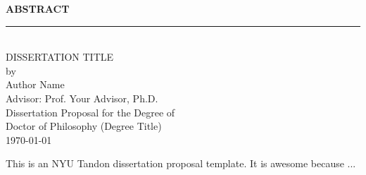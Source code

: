 \newcommand{\HRule}{\rule{8cm}{0.5mm}}

\begin{center}

\sffamily
\LARGE
\textbf{ABSTRACT} \\
\HRule \\
\textsc{
\textrm{DISSERTATION TITLE}}\\[0.25cm]

\normalsize{by} \\[0.5cm]
\Large
\textrm{
Author Name\\[0.5cm]
Advisor: Prof. Your Advisor, Ph.D.}\\[.5cm]

\normalsize
\textrm{Dissertation Proposal for the Degree of \\
Doctor of Philosophy (Degree Title)} \\[0.5cm]

\textrm{
{\today}} \\[1cm]

\end{center}

\normalsize
This is an NYU Tandon dissertation proposal template. It is awesome because ...
